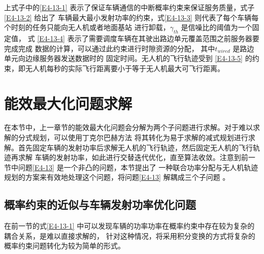 上式子中的\eqref{E4-13-1} 表示了保证车辆通信的中断概率约束来保证服务质量，式子\eqref{E4-13-2} 给出了
车辆最大最小发射功率的约束，式\eqref{E4-13-3} 则代表了每个车辆每个时刻的任务只能向无人机或者地面基站
进行卸载，$\gamma_{th}$ 是信噪比的阈值为一个固定值，%
式 \eqref{E4-13-4} 表示了需要调度车辆在其驶出路边单元覆盖范围之前服务器要完成完成
数据的计算，可以通过此约束进行时隙资源的分配，
其中$t_{wired}$ 是路边单元向边缘服务器发送数据时的
固定时间。无人机的飞行轨迹受到 \eqref{E4-13-5} 的约束，即无人机每秒的实际飞行距离要小于等于无人机最大可飞行距离。

\section{能效最大化问题求解}\label{section4-3}
在本节中，上一章节的能效最大化问题会分解为两个子问题进行求解。对于难以求解的分式规划，可以使用丁克尔巴赫方法
将其转化为易于求解的减式规划进行求解。首先固定车辆的发射功率后求解无人机的飞行轨迹，然后固定无人机的飞行轨迹再求解
车辆的发射功率，如此进行交替迭代优化，直至算法收敛。注意到前一节中问题\eqref{E4-13} 是一个非凸的问题，本节提出了
一种联合功率分配与无人机轨迹规划的方案来有效地处理这个问题，将问题\eqref{E4-13} 解耦成三个子问题 \supercite{JointTrajectory9627548}。
\subsection{概率约束的近似与车辆发射功率优化问题}\label{section4-3-1}
在前一节的式\eqref{E4-13-1} 中可以发现车辆的功率功率在概率约束中存在较为复杂的耦合关系，是难以直接求解的，
针对这种情况，将采用积分变换的方式将复杂的概率约束问题转化为较为简单的形式。

